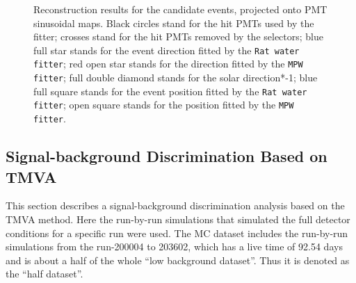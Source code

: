 \begin{figure}[htbp]
{\begin{minipage}[t]{0.4\textwidth}
		\end{minipage}
	}
	\caption[Reconstruction results for the candidate events, projected onto PMT sinusoidal maps.]{Reconstruction results for the candidate events, projected onto PMT sinusoidal maps. Black circles stand for
		the hit PMTs used by the fitter; crosses stand for the hit PMTs removed by the selectors; blue full star stands for the event direction fitted by the \texttt{Rat water fitter}; red open star stands for the direction fitted by the \texttt{MPW fitter}; full double diamond stands for the solar direction*-1; blue full square stands for the event position fitted by the \texttt{Rat water fitter}; open square stands for the position fitted by the \texttt{MPW fitter}.}
	\label{openDataSetCandidate}
\end{figure}


\subsection{Signal-background Discrimination Based on TMVA}\label{sect:tmva}
This section describes a signal-background discrimination analysis based on the TMVA method. Here the run-by-run simulations that simulated the full detector conditions for a specific run were used. The MC dataset includes the run-by-run simulations from the run-200004 to 203602, which has a live time of 92.54 days and is about a half of the whole ``low background dataset''. Thus it is denoted as the ``half dataset''.

